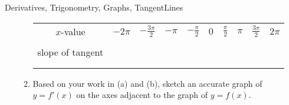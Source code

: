 \begin{tagblock}{Derivatives, Trigonometry, Graphs, TangentLines}
\begin{question}
\begin{enumerate}
\begin{enumerate}
\begin{tabular}{|c|c|c|c|c|c|c|c|c|c|} \hline
$x$-value & $-2 \pi$ & $-\frac{3\pi}{2}$ & $- \pi$ &  $-\frac{\pi}{2}$ &$ 0$ & $\frac{\pi}{2}$ & $\pi$ & $\frac{3\pi}{2}$& $2\pi$ \\ 
& \hspace{.3in} &  \hspace{.3in} & \hspace{.3in} & \hspace{.3in} & \hspace{.3in} & \hspace{.3in} & \hspace{.3in} & \hspace{.3in} & \hspace{.3in} \\ \hline 
slope of tangent & \hspace{.3in} &  \hspace{.3in} & \hspace{.3in} & \hspace{.3in} & \hspace{.3in} & \hspace{.3in} & \hspace{.3in} & \hspace{.3in} & \hspace{.3in}  \\
& \hspace{.3in} &  \hspace{.3in} & \hspace{.3in} & \hspace{.3in} & \hspace{.3in} & \hspace{.3in} & \hspace{.3in} & \hspace{.3in} & \hspace{.3in}\\
& \hspace{.3in} &  \hspace{.3in} & \hspace{.3in} & \hspace{.3in} & \hspace{.3in} & \hspace{.3in} & \hspace{.3in} & \hspace{.3in} & \hspace{.3in}\\ \hline
\end{tabular}
\bigskip

\item Based on your work in (a) and (b), sketch an accurate graph of $y=f'(x)$ on the axes adjacent to the graph of $y=f(x)$.  


\end{enumerate}
\end{enumerate}
\end{question}
\end{tagblock}
